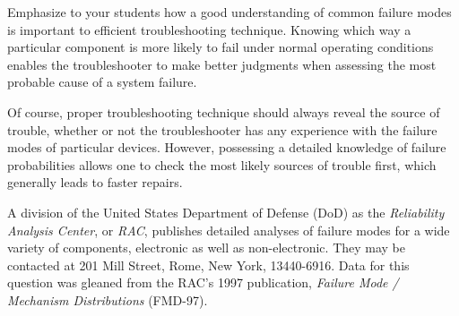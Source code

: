 





Emphasize to your students how a good understanding of common failure modes is important to efficient troubleshooting technique.  Knowing which way a particular component is more likely to fail under normal operating conditions enables the troubleshooter to make better judgments when assessing the most probable cause of a system failure.  

Of course, proper troubleshooting technique should always reveal the source of trouble, whether or not the troubleshooter has any experience with the failure modes of particular devices.  However, possessing a detailed knowledge of failure probabilities allows one to check the most likely sources of trouble first, which generally leads to faster repairs.

A division of the United States Department of Defense (DoD) as the {\it Reliability Analysis Center}, or {\it RAC}, publishes detailed analyses of failure modes for a wide variety of components, electronic as well as non-electronic.  They may be contacted at 201 Mill Street, Rome, New York, 13440-6916.  Data for this question was gleaned from the RAC's 1997 publication, {\it Failure Mode / Mechanism Distributions} (FMD-97).




